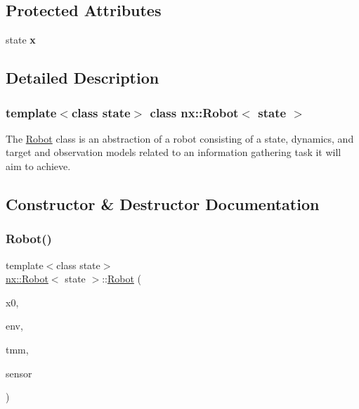 \subsection*{Protected Attributes}
\begin{DoxyCompactItemize}
\item 
\mbox{\label{classnx_1_1Robot_a72ae1d7aee42258b8a580f791a1bf344}} 
state {\bfseries x}
\end{DoxyCompactItemize}


\subsection{Detailed Description}
\subsubsection*{template$<$class state$>$\newline
class nx\+::\+Robot$<$ state $>$}

The \hyperlink{classnx_1_1Robot}{Robot} class is an abstraction of a robot consisting of a state, dynamics, and target and observation models related to an information gathering task it will aim to achieve. 

\subsection{Constructor \& Destructor Documentation}
\mbox{\label{classnx_1_1Robot_ae20fd90482b8fd35e5a36f802b202ce7}} 
\subsubsection{\texorpdfstring{Robot()}{Robot()}}
{\footnotesize\ttfamily template$<$class state$>$ \\
\hyperlink{classnx_1_1Robot}{nx\+::\+Robot}$<$ state $>$\+::\hyperlink{classnx_1_1Robot}{Robot} (\begin{DoxyParamCaption}\item[{state}]{x0,  }\item[{std\+::shared\+\_\+ptr$<$ \hyperlink{classnx_1_1Environment}{Environment}$<$ state $>$$>$ \&}]{env,  }\item[{std\+::shared\+\_\+ptr$<$ \hyperlink{classnx_1_1InfoTargetModel}{Info\+Target\+Model} $>$}]{tmm,  }\item[{std\+::shared\+\_\+ptr$<$ \hyperlink{classnx_1_1Sensor}{Sensor}$<$ state $>$$>$}]{sensor }\end{DoxyParamCaption})\hspace{0.3cm}{\ttfamily [inline]}}

